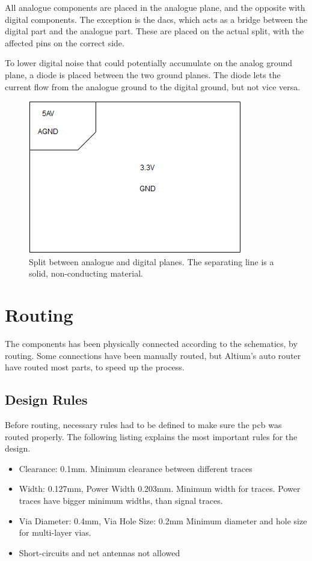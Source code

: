All analogue components are placed in the analogue plane, and the opposite with digital components.
The exception is the \gls{dac}s, which acts as a bridge between the digital part and the analogue part.
These are placed on the actual split, with the affected pins on the correct side.

To lower digital noise that could potentially accumulate on the analog ground plane, a diode is placed between the two ground planes.
The diode lets the current flow from the analogue ground to the digital ground, but not vice versa.

\begin{figure}[h!]
\centering
\includegraphics[scale = 0.6]{images/Split_planes.png}
\caption{Split between analogue and digital planes. The separating line is a solid, non-conducting material.}
\label{fig:Split planes}
\end{figure}

\section{Routing}
The components has been physically connected according to the schematics, by routing.
Some connections have been manually routed, but Altium's auto router have routed most parts, to speed up the process.

\subsection{Design Rules}
Before routing, necessary rules had to be defined to make sure the \gls{pcb} was routed properly.
The following listing explains the most important rules for the design.
\begin{itemize}
\item Clearance: 0.1mm.
\newline
Minimum clearance between different traces
\item Width: 0.127mm, Power Width 0.203mm.
\newline
Minimum width for traces.
Power traces have bigger minimum widths, than signal traces.
\item Via Diameter: 0.4mm, Via Hole Size: 0.2mm
\newline
Minimum diameter and hole size for multi-layer vias.
\item Short-circuits and net antennas not allowed
\end{itemize}

